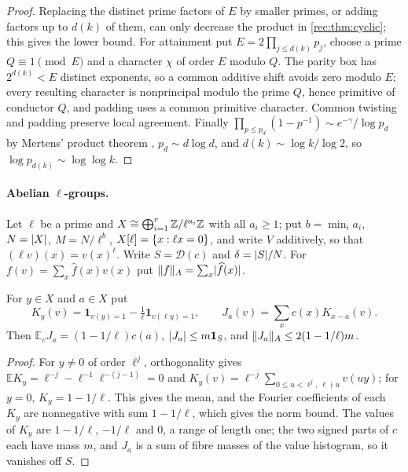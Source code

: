 \begin{proof}
Replacing the distinct prime factors of $E$ by smaller primes, or adding factors up to $d(k)$ of them, can
only decrease the product in \cref{rec:thm:cyclic}; this gives the lower bound. For attainment put
$E=2\prod_{j\le d(k)}p_j$, choose a prime $Q\equiv1\pmod E$ and a character $\chi$ of order $E$ modulo $Q$. The parity
box has $2^{d(k)}<E$ distinct exponents, so a common additive shift avoids zero modulo $E$; every resulting
character is nonprincipal modulo the prime $Q$, hence primitive of conductor $Q$, and padding uses a
common primitive character. Common twisting and padding preserve local agreement. Finally
$\prod_{p\le p_d}(1-p^{-1})\sim e^{-\gamma}/\log p_d$ by Mertens' product theorem \cite[Eq.~(3)]{KeliherLee2024Constants}, $p_d\sim d\log d$, and
$d(k)\sim\log k/\log2$, so $\log p_{d(k)}\sim\log\log k$.
\end{proof}

\paragraph{Abelian $\ell$-groups.}
Let $\ell$ be a prime and $X\cong\bigoplus_{i=1}^r\mathbb{Z}/\ell^{a_i}\mathbb{Z}$ with all $a_i\ge1$; put $b=\min_ia_i$, $N=\lvert X\rvert$, $M=N/\ell^b$,
$X[\ell]=\{x:\ell x=0\}$, and write $V$ additively, so that $(\ell v)(x)=v(x)^\ell$. Write $S=\mathcal D(c)$ and $\delta=\lvert S\rvert/N$.
For $f(v)=\sum_x\widehat f(x)v(x)$ put $\lVert f\rVert_A=\sum_x\lvert\widehat f(x)\rvert$.

\begin{lemma}\label{rec:lem:pproj}
For $y\in X$ and $a\in X$ put
\[
 K_y(v)=\mathbf 1_{v(y)=1}-\tfrac1\ell\mathbf 1_{v(\ell y)=1},\qquad J_a(v)=\sum_xc(x)K_{x-a}(v).
\]
Then $\mathbb E_vJ_a=(1-1/\ell)c(a)$, $\lvert J_a\rvert\le m\mathbf 1_S$, and $\lVert J_a\rVert_A\le2(1-1/\ell)m$.
\end{lemma}

\begin{proof}
For $y\ne0$ of order $\ell^j$, orthogonality gives $\mathbb EK_y=\ell^{-j}-\ell^{-1}\ell^{-(j-1)}=0$ and
$K_y(v)=\ell^{-j}\sum_{0\le u<\ell^j,\ \ell\nmid u}v(uy)$; for $y=0$, $K_y=1-1/\ell$. This gives the mean, and the Fourier
coefficients of each $K_y$ are nonnegative with sum $1-1/\ell$, which gives the norm bound. The values of $K_y$
are $1-1/\ell$, $-1/\ell$ and $0$, a range of length one; the two signed parts of $c$ each have mass $m$, and $J_a$ is
a sum of fibre masses of the value histogram, so it vanishes off $S$.
\end{proof}

